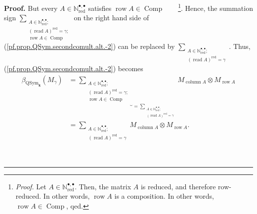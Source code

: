 \documentclass[numbers=enddot,12pt,final,onecolumn,notitlepage,abstracton]{scrartcl}%
\theoremstyle{definition}
\newenvironment{proof}[1][Proof]{\noindent\textbf{#1.} }{\ \rule{0.5em}{0.5em}}
\let\sumnonlimits\sum
\renewcommand{\sum}{\sumnonlimits\limits}
\begin{document}
\begin{proof}
But every $A\in\mathbb{N}_{\operatorname*{red}}^{\bullet,\bullet}$ satisfies
$\operatorname*{row}A\in\operatorname*{Comp}$\ \ \ \ \footnote{\textit{Proof.}
Let $A\in\mathbb{N}_{\operatorname*{red}}^{\bullet,\bullet}$. Then, the matrix
$A$ is reduced, and therefore row-reduced. In other words,
$\operatorname*{row}A$ is a composition. In other words, $\operatorname*{row}%
A\in\operatorname*{Comp}$, qed.}. Hence, the summation sign $\sum
_{\substack{A\in\mathbb{N}_{\operatorname*{red}}^{\bullet,\bullet}%
\text{;}\\\left(  \operatorname*{read}A\right)  ^{\operatorname*{red}}%
=\gamma\text{;}\\\operatorname*{row}A\in\operatorname*{Comp}}}$ on the right
hand side of (\ref{pf.prop.QSym.secondcomult.alt.-2}) can be replaced by
$\sum_{\substack{A\in\mathbb{N}_{\operatorname*{red}}^{\bullet,\bullet
}\text{;}\\\left(  \operatorname*{read}A\right)  ^{\operatorname*{red}}%
=\gamma}}$. Thus, (\ref{pf.prop.QSym.secondcomult.alt.-2}) becomes%
\begin{align}
\beta_{\operatorname*{QSym}\nolimits_{\mathbf{k}}}\left(  M_{\gamma}\right)
&  =\underbrace{\sum_{\substack{A\in\mathbb{N}_{\operatorname*{red}}%
^{\bullet,\bullet}\text{;}\\\left(  \operatorname*{read}A\right)
^{\operatorname*{red}}=\gamma\text{;}\\\operatorname*{row}A\in
\operatorname*{Comp}}}}_{=\sum_{\substack{A\in\mathbb{N}_{\operatorname*{red}%
}^{\bullet,\bullet}\text{;}\\\left(  \operatorname*{read}A\right)
^{\operatorname*{red}}=\gamma}}}M_{\operatorname*{column}A}\otimes
M_{\operatorname*{row}A}\nonumber\\
&  =\sum_{\substack{A\in\mathbb{N}_{\operatorname*{red}}^{\bullet,\bullet
}\text{;}\\\left(  \operatorname*{read}A\right)  ^{\operatorname*{red}}%
=\gamma}}M_{\operatorname*{column}A}\otimes M_{\operatorname*{row}A}.
\label{pf.prop.QSym.secondcomult.alt.-1}%
\end{align}



\end{proof}
\end{document}
